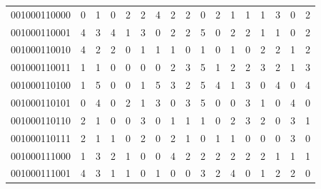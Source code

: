 \documentclass[10pt,a4paper]{article}
\begin{document}
\begin{longtable}{ |c|c|c|c|c|c|c|c|c|c|c|c|c|c|c|c|c| }
    001000110000              & 0                            & 1                                & 0                            & 2                              & 2   & 4   & 2   & 2   & 0   & 2   & 1   & 1   & 1   & 3   & 0   & 2   \\
    001000110001              & 4                            & 3                                & 4                            & 1                              & 3   & 0   & 2   & 2   & 5   & 0   & 2   & 2   & 1   & 1   & 0   & 2   \\
    001000110010              & 4                            & 2                                & 2                            & 0                              & 1   & 1   & 1   & 0   & 1   & 0   & 1   & 0   & 2   & 2   & 1   & 2   \\
    001000110011              & 1                            & 1                                & 0                            & 0                              & 0   & 0   & 2   & 3   & 5   & 1   & 2   & 2   & 3   & 2   & 1   & 3   \\
    001000110100              & 1                            & 5                                & 0                            & 0                              & 1   & 5   & 3   & 2   & 5   & 4   & 1   & 3   & 0   & 4   & 0   & 4   \\
    001000110101              & 0                            & 4                                & 0                            & 2                              & 1   & 3   & 0   & 3   & 5   & 0   & 0   & 3   & 1   & 0   & 4   & 0   \\
    001000110110              & 2                            & 1                                & 0                            & 0                              & 3   & 0   & 1   & 1   & 1   & 0   & 2   & 3   & 2   & 0   & 3   & 1   \\
    001000110111              & 2                            & 1                                & 1                            & 0                              & 2   & 0   & 2   & 1   & 0   & 1   & 1   & 0   & 0   & 0   & 3   & 0   \\
    001000111000              & 1                            & 3                                & 2                            & 1                              & 0   & 0   & 4   & 2   & 2   & 2   & 2   & 2   & 2   & 1   & 1   & 1   \\
    001000111001              & 4                            & 3                                & 1                            & 1                              & 0   & 1   & 0   & 0   & 3   & 2   & 4   & 0   & 1   & 2   & 2   & 0   \\

\end{longtable}
\end{document}
